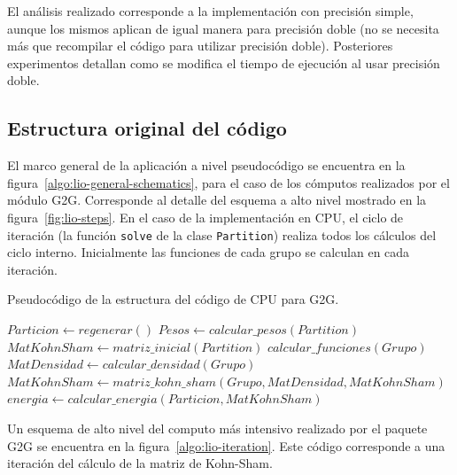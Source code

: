 El an\'alisis realizado corresponde a la implementaci\'on con precisi\'on simple,
aunque los mismos aplican de igual manera para precisi\'on doble (no se necesita
m\'as que recompilar el c\'odigo para utilizar precisi\'on doble). Posteriores
experimentos detallan como se modifica el tiempo de ejecuci\'on al usar
precisi\'on doble.


\subsection{Estructura original del c\'odigo}

El marco general de la aplicaci\'on a nivel pseudoc\'odigo se encuentra en la
figura~\ref{algo:lio-general-schematics}, para el caso de los c\'omputos realizados
por el m\'odulo G2G. Corresponde al detalle del esquema
a alto nivel mostrado en la figura~\ref{fig:lio-steps}. En el caso de la
implementaci\'on en CPU, el ciclo de iteraci\'on (la funci\'on \texttt{solve} de
la clase \texttt{Partition}) realiza todos los c\'alculos del
ciclo interno. Inicialmente las funciones de cada grupo se calculan en cada
iteraci\'on.

\begin{algorithm}[hptb]
    \caption{Pseudoc\'odigo de la estructura del c\'odigo de CPU para G2G.}
    \label{algo:lio-general-schematics}
    \begin{algorithmic}
        \State $Particion \gets regenerar()$
        \State $Pesos \gets calcular\_pesos(Partition)$
        \State $MatKohnSham \gets matriz\_inicial(Partition)$
                \State $calcular\_funciones(Grupo)$
                \State $MatDensidad \gets calcular\_densidad(Grupo)$
                \State $MatKohnSham \gets matriz\_kohn\_sham(Grupo, MatDensidad, MatKohnSham)$
            \EndFor
        \EndWhile
        \State $energia \gets calcular\_energia(Particion, MatKohnSham)$
    \end{algorithmic}
\end{algorithm}

Un esquema de alto nivel del computo m\'as intensivo realizado por el paquete
G2G se encuentra en la figura~\ref{algo:lio-iteration}. Este c\'odigo corresponde
a una iteraci\'on del c\'alculo de la matriz de Kohn-Sham.

